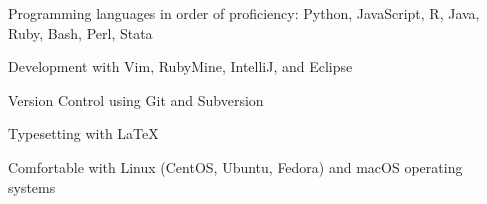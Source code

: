 

\begin{cvparagraph}

      \begin{cvitems}
        \item Programming languages in order of proficiency: Python, JavaScript, R, Java, Ruby, Bash, Perl, Stata
        \item Development with Vim, RubyMine, IntelliJ, and Eclipse
        \item Version Control using Git and Subversion
        \item Typesetting with LaTeX
        \item Comfortable with Linux (CentOS, Ubuntu, Fedora) and macOS operating systems
      \end{cvitems}

\end{cvparagraph}
